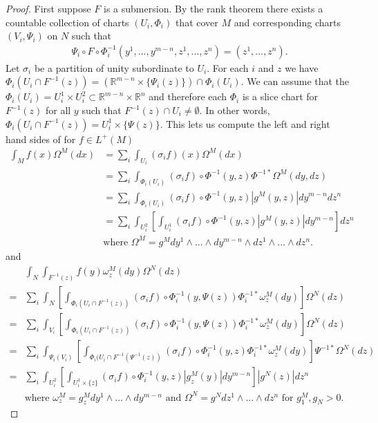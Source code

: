 \begin{proof}
First suppose $F$ is a submersion. By the rank theorem there exists a countable collection of charts $(U_i,\Phi_i)$ that cover $M$ and corresponding charts $(V_i,\Psi_i)$ on $N$ such that 
\begin{align}
\Psi_i\circ F\circ \Phi_i^{-1}(y^1,...,y^{m-n},z^1,...,z^n)=(z^1,...,z^n).
\end{align}
Let $\sigma_i$ be a partition of unity subordinate to $U_i$.  For each $i$ and $z$ we have $\Phi_i(U_i\cap F^{-1}(z))=\left(\mathbb{R}^{m-n}\times\{\Psi_i(z)\}\right)\cap \Phi_i(U_i)$.  We can assume that the $\Phi_i(U_i)=U_i^1\times U_i^2\subset \mathbb{R}^{m-n}\times \mathbb{R}^n$ and therefore each $\Phi_i$ is a slice chart for $F^{-1}(z)$ for all $y$ such that $F^{-1}(z)\cap U_i\neq \emptyset$.  In other words, $\Phi_i(U_i\cap F^{-1}(z))= U_i^1\times \{\Psi(z)\}$.  This lets us compute the left and right hand sides of  for $f\in L^+(M)$
\begin{align}
\int_Mf(x) \Omega^M(dx)&=\sum_i\int_{U_i}(\sigma_if)(x) \Omega^M(dx)\\
&=\sum_i\int_{\Phi_i(U_i)}(\sigma_if)\circ \Phi^{-1}(y,z) \Phi^{-1*}\Omega^M(dy,dz)\\
&=\sum_i\int_{\Phi_i(U_i)}(\sigma_if)\circ \Phi^{-1}(y,z)|g^M(y,z)| dy^{m-n}dz^n\\
&=\sum_i\int_{U_i^2}\left[\int_{U_i^1}(\sigma_if)\circ \Phi^{-1}(y,z)|g^M(y,z)| dy^{m-n}\right]dz^n\\
&\text{where }\Omega^M=g^M dy^1\wedge...\wedge dy^{m-n}\wedge dz^1\wedge...\wedge dz^n.
\end{align}
and
\small
\begin{align}
&\int_{N}\int_{F^{-1}(z)} f(y)\omega^M_z(dy) \Omega^N(dz)\\
=&\sum_i \int_{N}\left[\int_{\Phi_i(U_i\cap F^{-1}(z))} (\sigma_if)\circ\Phi_i^{-1}(y,\Psi(z))\Phi_i^{-1*}\omega^M_z(dy)\right] \Omega^N(dz)\\
=&\sum_i \int_{V_i}\left[\int_{\Phi_i(U_i\cap F^{-1}(z))} (\sigma_if)\circ\Phi_i^{-1}(y,\Psi(z))\Phi_i^{-1*}\omega^M_z(dy)\right] \Omega^N(dz)\\
=&\sum_i \int_{\Psi_i(V_i)}\left[\int_{\Phi_i(U_i\cap F^{-1}(\Psi^{-1}(z))} (\sigma_if)\circ\Phi_i^{-1}(y,z)\Phi_i^{-1*}\omega^M_z(dy)\right] \Psi^{-1*}\Omega^N(dz)\\
=&\sum_i \int_{U_i^2}\left[\int_{U_i^1\times \{z\}} (\sigma_if)\circ\Phi_i^{-1}(y,z)|g^M_z(y)| dy^{m-n}\right] |g^N(z)| dz^n\\
&\text{where }\omega^M_z=g^M_z dy^1\wedge...\wedge dy^{m-n} \text{ and }\Omega^N=g^N dz^1\wedge...\wedge dz^n \text{ for } g_1^M,g_N>0.
\end{align}
\normalsize
\begin{comment}
Here we used that if \pi_1\circ \Phi is the chart on F^{-1}(z) then the inverse is y->\Phi^{-1}(y,Psi(z)) since \pi_2\circ\Phi(x)=\Psi(z)
for any x\in F^{-1}(z)
\end{comment}


\end{proof}
